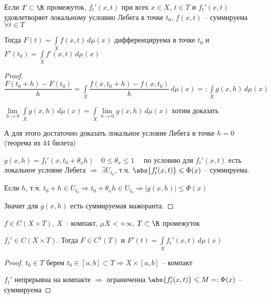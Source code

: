 
\begin{theorem}\thmslashn
	
	Если $T\subset \R$ промежуток, $f_t'(x, t)$ при всех $x \in X$, $t \in T$ и $f_t'(x, t)$ удовлетворяет локальному условию Лебега в точке $t_0$, $f(x, t)$ -- суммируема $\forall t \in T$
	
	Тогда $F(t) = \int\limits_X f(x,t) \, d\mu (x)$ дифференцируема в точке $t_0$ и $F'(t_0) = \int\limits_X f'(x,t) \, d\mu (x)$
	
\end{theorem}

\begin{proof}\thmslashn
	
	$\dfrac{F(t_0 + h) - F(t_0)}{h} = \int\limits_X \dfrac{f(x, t_0 + h) - f(x, t_0)}{h}\,d\mu(x) =: \int\limits_X g(x, h)\,d\mu (x)$
	
	$\lim\limits_{h \to 0} \int\limits_X g(x, h)\,d\mu(x) = \int\limits_X \lim\limits_{h \to 0} g(x, h)\,d\mu(x)$ хотим доказать
	
	А для этого достаточно доказать локальное условие Лебега в точке $h = 0$ (теорема из 44 билета)
	
	$g(x, h) = f_t'(x, t_0 + \theta_x h) \quad 0 \leqslant \theta_x \leqslant 1 \quad$ по условию для $f_t'(x, t)$ есть локальное условие Лебега $\Rightarrow$ $\exists U_{t_0}$, т.ч. $\abs{f_t'(x, t)} \leqslant \Phi(x)$ -- суммируема. 
	
	Если $h$, т.ч. $t_0 + h \in U_{t_0} \Rightarrow t_0 + \theta_xh \in U_{t_0} \Rightarrow |g(x, h)| \leqslant \Phi(x)$ 
	
	Значит для $g(x, h)$ есть суммируемая мажоранта.
	
\end{proof}



\begin{consequence}\thmslashn
	
	$f \in C(X\times T)$, $X$ -- компакт, $\mu X < + \infty$, $T \subset \R$ промежуток
	
	$f_t' \in C(X \times T)$. Тогда $F \in C^1(T)$ и $F'(t) = \int\limits_X f_t'(x, t)\,d\mu(x)$
	
\end{consequence}

\begin{proof}\thmslashn
	
	$t_0 \in T$ берем $t_0 \in [a,b] \subset T \Rightarrow X \times [a, b]$ -- компакт
	
	$f_t'$ непрерывна на компакте $\Rightarrow$ ограниченна $\abs{f_t'(x, t)} \leqslant M =: \Phi(x)$ -- суммируема
	
\end{proof}

